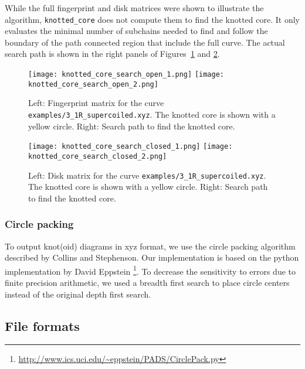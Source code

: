 While the full fingerprint and disk matrices were shown to illustrate the algorithm, \lstinline{knotted_core} does not compute them to find the knotted core. It only evaluates the minimal number of subchains needed to find and follow the boundary of the path connected region that include the full curve. The actual search path is shown in the right panels of Figures~\ref{fig:algorithm:knottedcore:open} and \ref{fig:algorithm:knottedcore:closed}.
\begin{figure}[t]
\centering
\texttt{[image: knotted\_core\_search\_open\_1.png]}
\texttt{[image: knotted\_core\_search\_open\_2.png]}
\caption{Left: Fingerprint matrix for the curve \lstinline{examples/3_1R_supercoiled.xyz}. The knotted core is shown with a yellow circle. Right: Search path to find the knotted core.}\label{fig:algorithm:knottedcore:open}
\end{figure}
\begin{figure}[t]
\centering
\texttt{[image: knotted\_core\_search\_closed\_1.png]}
\texttt{[image: knotted\_core\_search\_closed\_2.png]}
\caption{Left: Disk matrix for the curve \lstinline{examples/3_1R_supercoiled.xyz}. The knotted core is shown with a yellow circle. Right: Search path to find the knotted core.}\label{fig:algorithm:knottedcore:closed}
\end{figure}

\subsubsection{\label{sec:algorithms:circlepacking}Circle packing}
To output knot(oid) diagrams in xyz format, we use the circle packing algorithm described by Collins and Stephenson\cite{Collins2003}.
Our implementation is based on the python implementation by David Eppstein \footnote{\url{http://www.ics.uci.edu/~eppstein/PADS/CirclePack.py}}. To decrease the sensitivity to errors due to finite precision arithmetic, we used a breadth first search to place circle centers instead of the original depth first search.


\subsection{File formats}
